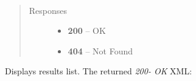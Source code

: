\documentclass[letterpaper,10pt,english]{sphinxmanual}
\begin{document}

\begin{fulllineitems}
\label{01_how_to_use_it:method-get-results}~\begin{quote}\begin{description}
\item[{Responses}] \leavevmode\begin{itemize}
\item {} 
\textbf{200} -- OK

\item {} 
\textbf{404} -- Not Found

\end{itemize}

\end{description}\end{quote}

Displays results list.
The returned \emph{200- OK} XML:


\end{fulllineitems}
\end{document}
